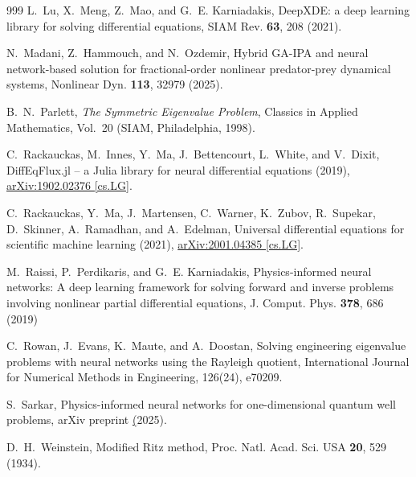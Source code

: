 \documentclass[11pt]{amsart}
\theoremstyle{definition}
\theoremstyle{remark}
\theoremstyle{plain}
\begin{document}
\begin{thebibliography}{999}
L.~Lu, X.~Meng, Z.~Mao, and G.~E. Karniadakis,
DeepXDE: a deep learning library for solving differential equations,
SIAM Rev. \textbf{63}, 208 (2021).

N.~Madani, Z.~Hammouch, and N.~Ozdemir,
Hybrid GA-IPA and neural network-based solution for fractional-order nonlinear predator-prey dynamical systems,
Nonlinear Dyn. \textbf{113}, 32979 (2025).

B.~N.~Parlett, \emph{The Symmetric Eigenvalue Problem}, Classics in Applied Mathematics, Vol.~20 (SIAM, Philadelphia, 1998).


C.~Rackauckas, M.~Innes, Y.~Ma, J.~Bettencourt, L.~White, and V.~Dixit,
DiffEqFlux.jl -- a Julia library for neural differential equations (2019),
\href{https://arxiv.org/abs/1902.02376}{arXiv:1902.02376 [cs.LG]}.

C.~Rackauckas, Y.~Ma, J.~Martensen, C.~Warner, K.~Zubov, R.~Supekar, D.~Skinner, A.~Ramadhan, and A.~Edelman,
Universal differential equations for scientific machine learning (2021),
\href{https://arxiv.org/abs/2001.04385}{arXiv:2001.04385 [cs.LG]}.

M.~Raissi, P.~Perdikaris, and G.~E. Karniadakis,
Physics-informed neural networks: A deep learning framework for solving forward and inverse problems involving nonlinear partial differential equations, J. Comput. Phys. \textbf{378}, 686 (2019)



C.~Rowan, J.~Evans, K.~Maute, and A.~Doostan,
Solving engineering eigenvalue problems with neural networks using the Rayleigh quotient, International Journal for Numerical Methods in Engineering, 126(24), e70209.

S.~Sarkar,
Physics-informed neural networks for one-dimensional quantum well problems, arXiv preprint \href{arXiv:2504.05367} (2025).




D.~H.~Weinstein, Modified Ritz method, Proc. Natl. Acad. Sci. USA \textbf{20}, 529 (1934).



\end{thebibliography}
\end{document}
